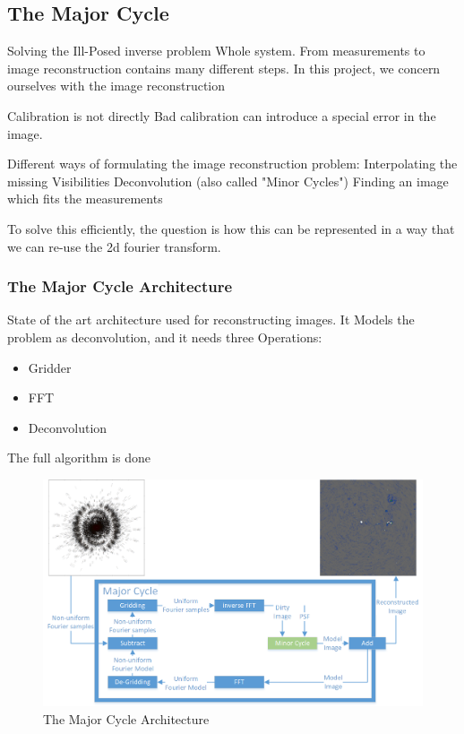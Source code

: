 \subsection{The Major Cycle}

Solving the Ill-Posed inverse problem
Whole system.
From measurements to image reconstruction contains many different steps. In this project, we concern ourselves with the image reconstruction



Calibration is not directly
Bad calibration can introduce a special error in the image.

Different ways of formulating the image reconstruction problem:
Interpolating the missing Visibilities
Deconvolution (also called "Minor Cycles")
Finding an image which fits the measurements

To solve this efficiently, the question is how this can be represented in a way that we can re-use the 2d fourier transform.

\subsubsection{The Major Cycle Architecture}
State of the art architecture used for reconstructing images. It Models the problem as deconvolution, and it needs three Operations:
\begin{itemize}
	\item Gridder
	\item FFT
	\item Deconvolution
\end{itemize}

The full algorithm is done 

\begin{figure}[h]
	\centering
	\includegraphics[width=0.80\linewidth]{./chapters/02.hypo/Major-Minor3.png}
	\caption{The Major Cycle Architecture}
	\label{intro:major}
\end{figure}

